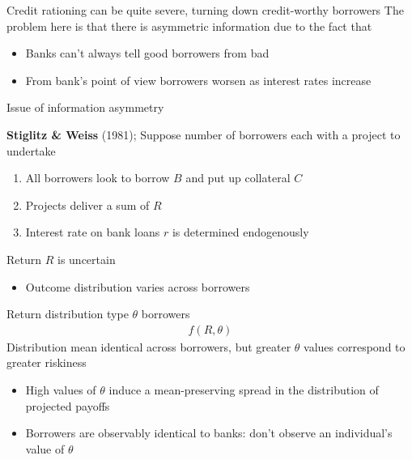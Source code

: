 \documentclass{beamer}
\begin{document}
\begin{frame}
 Credit rationing can be quite severe, turning down credit-worthy borrowers
The problem here is that there is asymmetric information due to the fact that 
\begin{itemize}
  \item Banks can't always tell good borrowers from bad
  \item From bank's point of view borrowers worsen as interest rates increase
\end{itemize}
  \medskip
  Issue of information asymmetry
\end{frame}

\begin{frame}
 \textbf{Stiglitz \& Weiss} (1981); Suppose number of borrowers each with a project to undertake
\begin{enumerate}
  \item All borrowers look to borrow $B$ and put up collateral $C$
  \item Projects deliver a sum of $R$  
  \item Interest rate on bank loans $r$ is determined endogenously
\end{enumerate}
\end{frame}

\begin{frame} 
 Return $R$ is uncertain
 \begin{itemize}
   \item Outcome distribution varies across borrowers 
 \end{itemize}
 \medskip
 Return distribution type $\theta$ borrowers 
 \begin{align}
   f(R,\theta)
 \end{align}
 \medskip
 Distribution mean identical across borrowers, but greater $\theta$ values correspond to greater riskiness
 \begin{itemize}
   \item High values of $\theta$ induce a mean-preserving spread in the distribution of projected payoffs
   \item Borrowers are observably identical to banks: don't observe an individual's value of $\theta$
 \end{itemize}
\end{frame}
\end{document}
